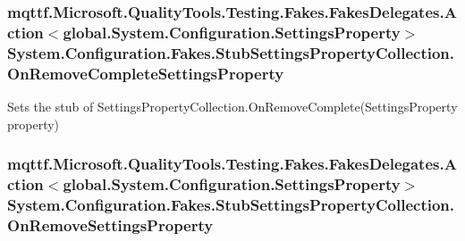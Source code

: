 \hypertarget{class_system_1_1_configuration_1_1_fakes_1_1_stub_settings_property_collection_a198768502777d88a6bb898774be0c091}{
\subsubsection[{On\-Remove\-Complete\-Settings\-Property}]{\setlength{\rightskip}{0pt plus 5cm}mqttf.\-Microsoft.\-Quality\-Tools.\-Testing.\-Fakes.\-Fakes\-Delegates.\-Action$<$global.\-System.\-Configuration.\-Settings\-Property$>$ System.\-Configuration.\-Fakes.\-Stub\-Settings\-Property\-Collection.\-On\-Remove\-Complete\-Settings\-Property}}\label{class_system_1_1_configuration_1_1_fakes_1_1_stub_settings_property_collection_a198768502777d88a6bb898774be0c091}


Sets the stub of Settings\-Property\-Collection.\-On\-Remove\-Complete(\-Settings\-Property property)

\hypertarget{class_system_1_1_configuration_1_1_fakes_1_1_stub_settings_property_collection_a96ef2ff5daf48c10e5484f9637661e28}{
\subsubsection[{On\-Remove\-Settings\-Property}]{\setlength{\rightskip}{0pt plus 5cm}mqttf.\-Microsoft.\-Quality\-Tools.\-Testing.\-Fakes.\-Fakes\-Delegates.\-Action$<$global.\-System.\-Configuration.\-Settings\-Property$>$ System.\-Configuration.\-Fakes.\-Stub\-Settings\-Property\-Collection.\-On\-Remove\-Settings\-Property}}\label{class_system_1_1_configuration_1_1_fakes_1_1_stub_settings_property_collection_a96ef2ff5daf48c10e5484f9637661e28}


